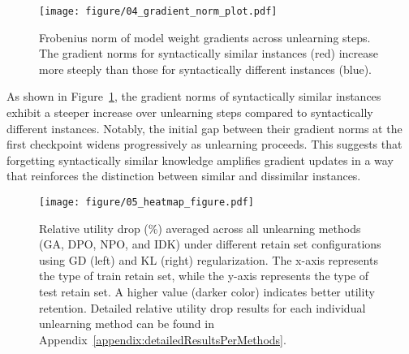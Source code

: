 \begin{figure}[t]
    \centering
    \texttt{[image: figure/04\_gradient\_norm\_plot.pdf]}
    \caption{Frobenius norm of model weight gradients across unlearning steps. The gradient norms for syntactically similar instances (red) increase more steeply than those for syntactically different instances (blue).}
    \label{fig:gradientanalysis}
\end{figure}
As shown in Figure~\ref{fig:gradientanalysis}, the gradient norms of syntactically similar instances exhibit a steeper increase over unlearning steps compared to syntactically different instances. Notably, the initial gap between their gradient norms at the first checkpoint widens progressively as unlearning proceeds. This suggests that forgetting syntactically similar knowledge amplifies gradient updates in a way that reinforces the distinction between similar and dissimilar instances.
\begin{figure*}[t]
    \centering
    \texttt{[image: figure/05\_heatmap\_figure.pdf]}
    \caption{Relative utility drop (\%) averaged across all unlearning methods (GA, DPO, NPO, and IDK) under different retain set configurations using GD (left) and KL (right) regularization. The x-axis represents the type of train retain set, while the y-axis represents the type of test retain set. A higher value (darker color) indicates better utility retention. Detailed relative utility drop results for each individual unlearning method can be found in Appendix~\ref{appendix:detailedResultsPerMethods}.}
    \label{fig:regularizationheapmap}
\end{figure*}